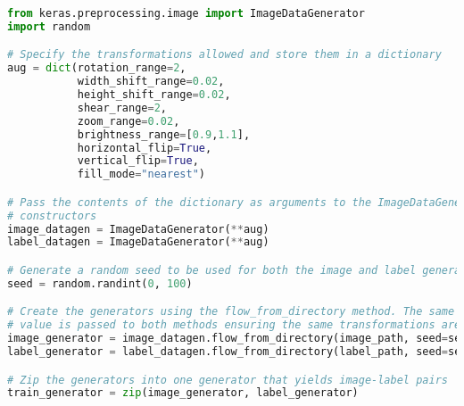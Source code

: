 \begin{lstlisting}[float={ht},caption={A simplified example of online augmentation implemented using the \texttt{ImageDataGenerator} class.},label={lst:augment},language=Python,upquote=true]
from keras.preprocessing.image import ImageDataGenerator
import random

# Specify the transformations allowed and store them in a dictionary
aug = dict(rotation_range=2,
           width_shift_range=0.02,
           height_shift_range=0.02,
           shear_range=2,
           zoom_range=0.02,
           brightness_range=[0.9,1.1],
           horizontal_flip=True,
           vertical_flip=True,
           fill_mode="nearest")

# Pass the contents of the dictionary as arguments to the ImageDataGenerator
# constructors
image_datagen = ImageDataGenerator(**aug)
label_datagen = ImageDataGenerator(**aug)

# Generate a random seed to be used for both the image and label generators
seed = random.randint(0, 100)

# Create the generators using the flow_from_directory method. The same seed
# value is passed to both methods ensuring the same transformations are applied.
image_generator = image_datagen.flow_from_directory(image_path, seed=seed, ...)
label_generator = label_datagen.flow_from_directory(label_path, seed=seed, ...)

# Zip the generators into one generator that yields image-label pairs
train_generator = zip(image_generator, label_generator)
\end{lstlisting}